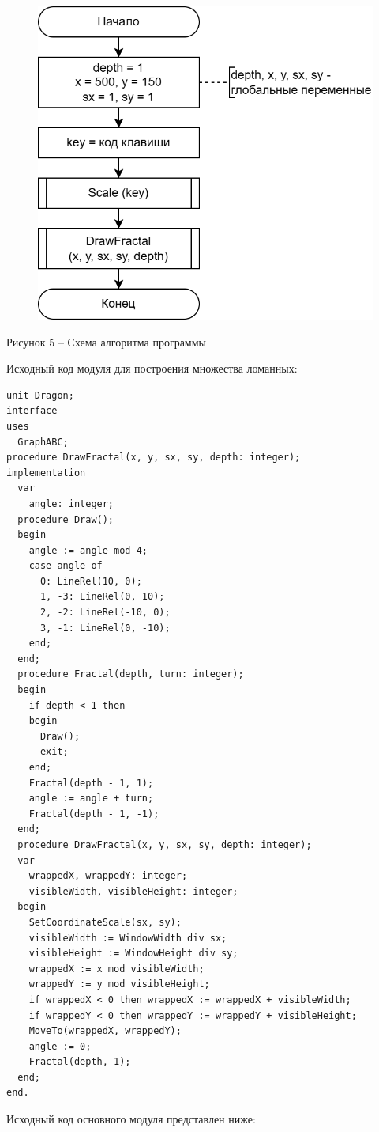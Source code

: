 \documentclass[a4paper,14pt]{extarticle}
\begin{document}
  \begin{figure}[h]
    \centering
    \includegraphics[width=0.5\linewidth]{images/s-5}
  \end{figure}
  \begin{center}
    Рисунок 5 – Схема алгоритма программы
  \end{center}

  \pagebreak

  Исходный код модуля для построения множества ломанных:

  \noindent
  \begin{Verbatim}[tabsize=4,fontsize=\small]
unit Dragon;
interface
uses
  GraphABC;
procedure DrawFractal(x, y, sx, sy, depth: integer);
implementation
  var
    angle: integer;
  procedure Draw();
  begin
    angle := angle mod 4;
    case angle of
      0: LineRel(10, 0);
      1, -3: LineRel(0, 10);
      2, -2: LineRel(-10, 0);
      3, -1: LineRel(0, -10);
    end;
  end;
  procedure Fractal(depth, turn: integer);
  begin
    if depth < 1 then
    begin
      Draw();
      exit;
    end;
    Fractal(depth - 1, 1);
    angle := angle + turn;
    Fractal(depth - 1, -1);
  end;
  procedure DrawFractal(x, y, sx, sy, depth: integer);
  var
    wrappedX, wrappedY: integer;
    visibleWidth, visibleHeight: integer;
  begin
    SetCoordinateScale(sx, sy);
    visibleWidth := WindowWidth div sx;
    visibleHeight := WindowHeight div sy;
    wrappedX := x mod visibleWidth;
    wrappedY := y mod visibleHeight;
    if wrappedX < 0 then wrappedX := wrappedX + visibleWidth;
    if wrappedY < 0 then wrappedY := wrappedY + visibleHeight;
    MoveTo(wrappedX, wrappedY);
    angle := 0;
    Fractal(depth, 1);
  end;
end.
  \end{Verbatim}

  Исходный код основного модуля представлен ниже:
\end{document}

